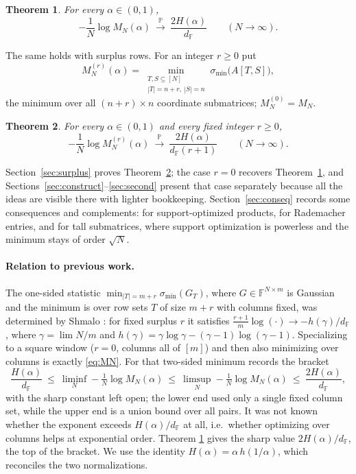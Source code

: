 \documentclass[11pt,reqno]{amsart}
\theoremstyle{plain}
\newtheorem{theorem}{Theorem}[section]
\theoremstyle{definition}
\theoremstyle{remark}
\newcommand{\F}{\mathbb{F}}
\newcommand{\PP}{\mathbb{P}}
\newcommand{\smin}{\sigma_{\min}}
\newcommand{\dF}{d_{\F}}
\begin{document}
\begin{theorem}\label{thm:main}
For every $\alpha\in(0,1)$,
\[
  -\frac1N\log M_N(\alpha)\ \xrightarrow{\ \PP\ }\ \frac{2H(\alpha)}{\dF}\qquad(N\to\infty).
\]
\end{theorem}

The same holds with surplus rows. For an integer $r\ge0$ put
\begin{equation}\label{eq:MNr}
  M_N^{(r)}(\alpha)=\min_{\substack{T,S\subseteq[N]\\ |T|=n+r,\ |S|=n}}\smin\bigl(A[T,S]\bigr),
\end{equation}
the minimum over all $(n+r)\times n$ coordinate submatrices; $M_N^{(0)}=M_N$.

\begin{theorem}\label{thm:surplus}
For every $\alpha\in(0,1)$ and every fixed integer $r\ge0$,
\[
  -\frac1N\log M_N^{(r)}(\alpha)\ \xrightarrow{\ \PP\ }\ \frac{2H(\alpha)}{\dF(r+1)}\qquad(N\to\infty).
\]
\end{theorem}

Section~\ref{sec:surplus} proves Theorem~\ref{thm:surplus}; the case $r=0$ recovers
Theorem~\ref{thm:main}, and Sections~\ref{sec:construct}--\ref{sec:second} present that case
separately because all the ideas are visible there with lighter bookkeeping. Section~\ref{sec:conseq}
records some consequences and complements: for support-optimized products, for Rademacher entries,
and for tall submatrices, where support optimization is powerless and the minimum stays of order
$\sqrt N$.

\paragraph{Relation to previous work.}
The one-sided statistic $\min_{|T|=m+r}\smin(G_T)$, where $G\in\F^{N\times m}$ is Gaussian and the
minimum is over row sets $T$ of size $m+r$ with columns fixed, was determined by Shmalo
\cite{shmalo}: for fixed surplus $r$ it satisfies $\tfrac{r+1}{m}\log(\cdot)\to-h(\gamma)/\dF$, where
$\gamma=\lim N/m$ and $h(\gamma)=\gamma\log\gamma-(\gamma-1)\log(\gamma-1)$. Specializing to a square
window ($r=0$, columns all of $[m]$) and then also minimizing over columns is exactly \eqref{eq:MN}.
For that two-sided minimum \cite{shmalo} records the bracket
\begin{equation}\label{eq:bracket}
  \frac{H(\alpha)}{\dF}\ \le\ \liminf_N-\tfrac1N\log M_N(\alpha)\ \le\ \limsup_N-\tfrac1N\log M_N(\alpha)\ \le\ \frac{2H(\alpha)}{\dF},
\end{equation}
with the sharp constant left open; the lower end used only a single fixed column set, while the
upper end is a union bound over all pairs. It was not known whether the exponent exceeds
$H(\alpha)/\dF$ at all, i.e.\ whether optimizing over columns helps at exponential order. Theorem
\ref{thm:main} gives the sharp value $2H(\alpha)/\dF$, the top of the bracket. We use the identity
$H(\alpha)=\alpha\,h(1/\alpha)$, which reconciles the two normalizations.
\end{document}
